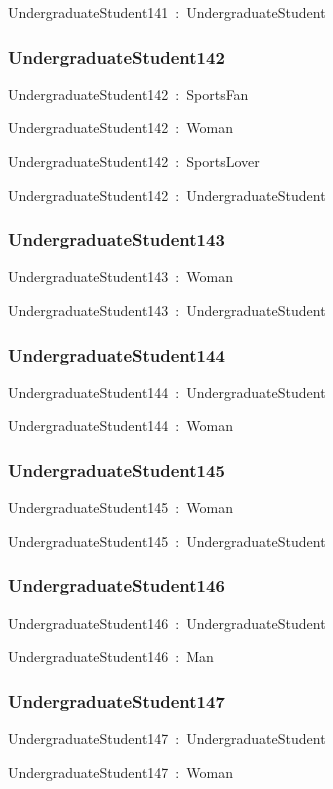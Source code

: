\documentclass{article}
\begin{document}
UndergraduateStudent141~:~UndergraduateStudent

\subsubsection*{UndergraduateStudent142}

UndergraduateStudent142~:~SportsFan

UndergraduateStudent142~:~Woman

UndergraduateStudent142~:~SportsLover

UndergraduateStudent142~:~UndergraduateStudent

\subsubsection*{UndergraduateStudent143}

UndergraduateStudent143~:~Woman

UndergraduateStudent143~:~UndergraduateStudent

\subsubsection*{UndergraduateStudent144}

UndergraduateStudent144~:~UndergraduateStudent

UndergraduateStudent144~:~Woman

\subsubsection*{UndergraduateStudent145}

UndergraduateStudent145~:~Woman

UndergraduateStudent145~:~UndergraduateStudent

\subsubsection*{UndergraduateStudent146}

UndergraduateStudent146~:~UndergraduateStudent

UndergraduateStudent146~:~Man

\subsubsection*{UndergraduateStudent147}

UndergraduateStudent147~:~UndergraduateStudent

UndergraduateStudent147~:~Woman
\end{document}
